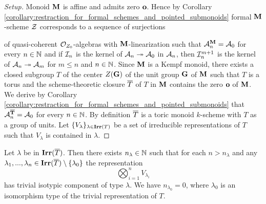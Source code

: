 \begin{proof}[Setup]
Monoid $\mathbf{M}$ is affine and admits zero $\mathbf{o}$. Hence by Corollary \ref{corollary:restraction_for_formal_schemes_and_pointed_submonoids} formal $\mathbf{M}$-scheme ${\mathcal Z}$ corresponds to a sequence of surjections
\begin{center}
\end{center}
of quasi-coherent ${\mathcal O}_{Z_0}$-algebras with $\mathbf{M}$-linearization such that ${\mathcal A}_n^{\mathbf{M}} = {\mathcal A}_0$ for every $n\in {\mathbb N}$ and if ${\mathcal I}_n$ is the kernel of ${\mathcal A}_n\twoheadrightarrow {\mathcal A}_0$ in ${\mathcal A}_n$, then ${\mathcal I}_n^{m+1}$ is the kernel of ${\mathcal A}_n\twoheadrightarrow {\mathcal A}_m$ for $m\leq n$ and $n\in {\mathbb N}$. Since $\mathbf{M}$ is a Kempf monoid, there exists a closed subgroup $T$ of the center $Z(\mathbf{G})$ of the unit group $\mathbf{G}$ of $\mathbf{M}$ such that $T$ is a torus and the scheme-theoretic closure $\overline{T}$ of $T$ in $\mathbf{M}$ contains the zero $\mathbf{o}$ of $\mathbf{M}$. We derive by Corollary \ref{corollary:restraction_for_formal_schemes_and_pointed_submonoids} that ${\mathcal A}_n^{\mathbf{\overline{T}}} = {\mathcal A}_0$ for every $n\in {\mathbb N}$. By definition $\overline{T}$ is a toric monoid $k$-scheme with $T$ as a group of units. Let $\{V_{\lambda}\}_{\lambda\in \mathbf{Irr}(T)}$ be a set of irreducible representations of $T$ such that $V_{\lambda}$ is contained in $\lambda$.
\end{proof}

\begin{lemma}\label{lemma:stablization_for_representations}
Let $\lambda$ be in $\mathbf{Irr}(\overline{T})$. Then there exists $n_{\lambda}\in {\mathbb N}$ such that for each $n > n_{\lambda}$ and any $\lambda_1,...,\lambda_n\in \mathbf{Irr}(\overline{T})\setminus \{\lambda_0\}$ the representation
$$\bigotimes_{i=1}^nV_{\lambda_i}$$ 
has trivial isotypic component of type $\lambda$. We have $n_{\lambda_0} = 0$, where $\lambda_0$ is an isomorphism type of the trivial representation of $T$.
\end{lemma}

